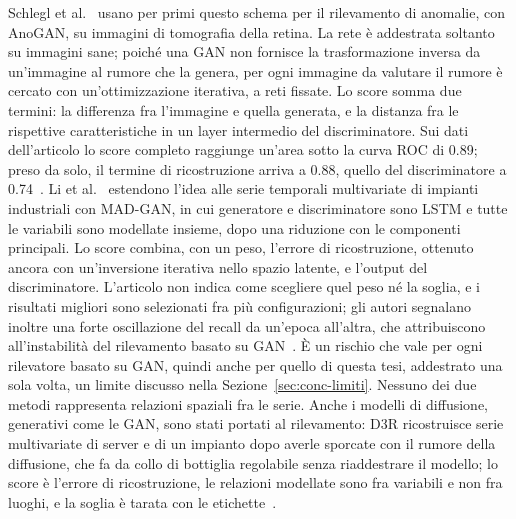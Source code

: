 Schlegl et al.~\cite{schlegl2017anogan} usano per primi questo schema per il rilevamento di anomalie, con AnoGAN, su immagini di tomografia della retina. La rete è addestrata soltanto su immagini sane; poiché una GAN non fornisce la trasformazione inversa da un'immagine al rumore che la genera, per ogni immagine da valutare il rumore è cercato con un'ottimizzazione iterativa, a reti fissate. Lo score somma due termini: la differenza fra l'immagine e quella generata, e la distanza fra le rispettive caratteristiche in un layer intermedio del discriminatore. Sui dati dell'articolo lo score completo raggiunge un'area sotto la curva ROC di 0.89; preso da solo, il termine di ricostruzione arriva a 0.88, quello del discriminatore a 0.74~\cite{schlegl2017anogan}. Li et al.~\cite{li2019madgan} estendono l'idea alle serie temporali multivariate di impianti industriali con MAD-GAN, in cui generatore e discriminatore sono LSTM e tutte le variabili sono modellate insieme, dopo una riduzione con le componenti principali. Lo score combina, con un peso, l'errore di ricostruzione, ottenuto ancora con un'inversione iterativa nello spazio latente, e l'output del discriminatore. L'articolo non indica come scegliere quel peso né la soglia, e i risultati migliori sono selezionati fra più configurazioni; gli autori segnalano inoltre una forte oscillazione del recall da un'epoca all'altra, che attribuiscono all'instabilità del rilevamento basato su GAN~\cite{li2019madgan}. È un rischio che vale per ogni rilevatore basato su GAN, quindi anche per quello di questa tesi, addestrato una sola volta, un limite discusso nella Sezione~\ref{sec:conc-limiti}. Nessuno dei due metodi rappresenta relazioni spaziali fra le serie. Anche i modelli di diffusione, generativi come le GAN, sono stati portati al rilevamento: D3R ricostruisce serie multivariate di server e di un impianto dopo averle sporcate con il rumore della diffusione, che fa da collo di bottiglia regolabile senza riaddestrare il modello; lo score è l'errore di ricostruzione, le relazioni modellate sono fra variabili e non fra luoghi, e la soglia è tarata con le etichette~\cite{wang2023d3r}.

